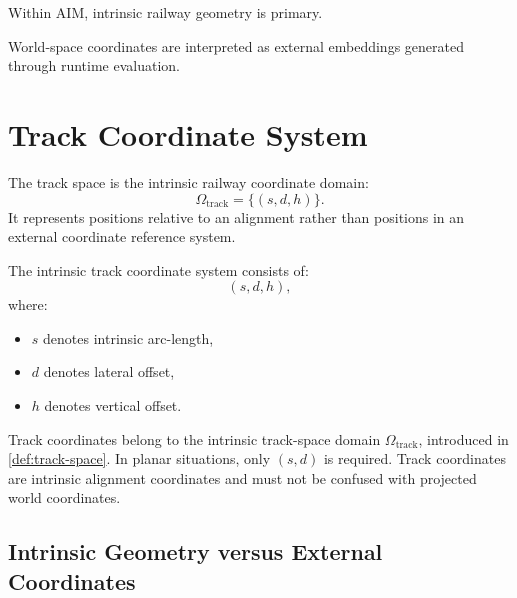 \begin{principle}
\label{princ:intrinsic-space-primacy}
Within AIM, intrinsic railway geometry is primary.

World-space coordinates are interpreted as external embeddings generated
through runtime evaluation.
\end{principle}

\section{Track Coordinate System}

\begin{definition}
\label{def:track-space}
The track space is the intrinsic railway coordinate domain:
\[
\Omega_{\mathrm{track}}
=
\{(s,d,h)\}.
\]
It represents positions relative to an alignment rather than positions
in an external coordinate reference system.
\end{definition}

\begin{definition}
\label{def:track-coordinate-system}
The intrinsic track coordinate system consists of:
\[
(s,d,h),
\]
where:
\begin{itemize}
\item \(s\) denotes intrinsic arc-length,
\item \(d\) denotes lateral offset,
\item \(h\) denotes vertical offset.
\end{itemize}
\end{definition}

Track coordinates belong to the intrinsic track-space domain
\(\Omega_{\mathrm{track}}\), introduced in \cref{def:track-space}. In
planar situations, only \((s,d)\) is required. Track coordinates are
intrinsic alignment coordinates and must not be confused with projected
world coordinates.


\subsection{Intrinsic Geometry versus External Coordinates}

